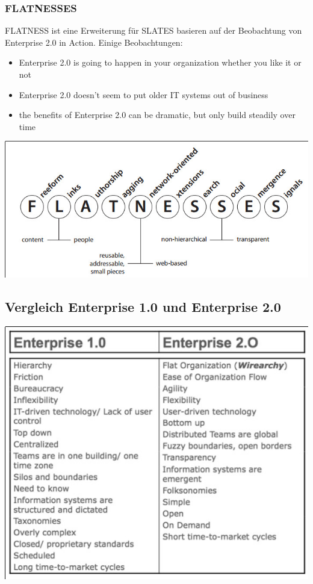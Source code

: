 \documentclass{article} %
\begin{document}
	\subsubsection{FLATNESSES}
	FLATNESS ist eine Erweiterung für SLATES basieren auf der Beobachtung von Enterprise 2.0 in Action. Einige Beobachtungen:
	\begin{itemize}
		\item Enterprise 2.0 is going to happen in your organization whether you
		like it or not
		\item Enterprise 2.0 doesn’t seem to put older IT systems out of business
		\item the benefits of Enterprise 2.0 can be dramatic, but only build steadily
		over time
	\end{itemize}
	\begin{center}
		\includegraphics[scale=0.5]{img/FLATNESS.jpg}
	\end{center}
	\subsection{Vergleich Enterprise 1.0 und Enterprise 2.0}
	\begin{center}
		\includegraphics[scale=0.8]{img/CompareW1W2.jpg}
	\end{center}
\end{document}
